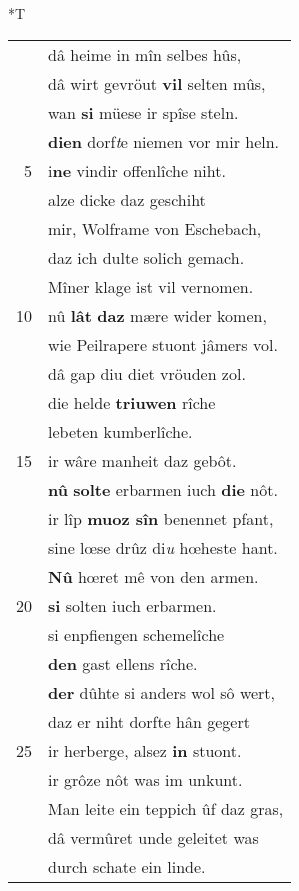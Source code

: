 \documentclass[8pt,a4paper,notitlepage]{article}
\begin{document}
\begin{table}[ht]
\hspace{0.5cm}
\begin{minipage}[t]{0.5\linewidth}
\small
\begin{center}*T
\end{center}
\begin{tabular}{rl}
 & dâ heime in mîn selbes hûs,\\ 
 & dâ wirt gevröut \textbf{vil} selten mûs,\\ 
 & wan \textbf{si} müese ir spîse steln.\\ 
 & \textbf{die}\textbf{n} dorf\textit{t}e niemen vor mir heln.\\ 
5 & i\textbf{ne} vindir offenlîche niht.\\ 
 & alze dicke daz geschiht\\ 
 & mir, Wolframe von Eschebach,\\ 
 & daz ich dulte solich gemach.\\ 
 & Mîner klage ist vil vernomen.\\ 
10 & nû \textbf{lât} \textbf{daz} mære wider komen,\\ 
 & wie Peilrapere stuont jâmers vol.\\ 
 & dâ gap diu diet vröuden zol.\\ 
 & die helde \textbf{triuwen} rîche\\ 
 & lebeten kumberlîche.\\ 
15 & ir wâre manheit daz gebôt.\\ 
 & \textbf{nû} \textbf{solte} erbarmen iuch \textbf{die} nôt.\\ 
 & ir lîp \textbf{muoz sîn} benennet pfant,\\ 
 & sine lœse drûz di\textit{u} hœheste hant.\\ 
 & \textbf{Nû} hœret mê von den armen.\\ 
20 & \textbf{si} solten iuch erbarmen.\\ 
 & si enpfiengen schemelîche\\ 
 & \textbf{den} gast ellens rîche.\\ 
 & \textbf{der} dûhte si anders wol sô wert,\\ 
 & daz er niht dorfte hân gegert\\ 
25 & ir herberge, alsez \textbf{in} stuont.\\ 
 & ir grôze nôt was im unkunt.\\ 
 & Man leite ein teppich ûf daz gras,\\ 
 & dâ vermûret unde geleitet was\\ 
 & durch schate ein linde.\\ 

\end{tabular}
\end{minipage}
\end{table}
\end{document}
